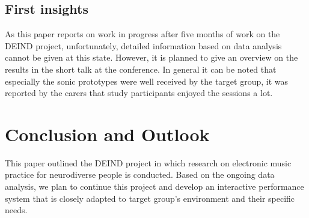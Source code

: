 \documentclass{chi-ext}
\begin{document}
\begin{multicols}{2}
% 
% 
% 
% 
% 
% 
% 
% 
% 
% 
\subsection{First insights}

As this paper reports on work in progress after five months of work on the DEIND project, unfortunately, detailed information based on data analysis cannot be given at this state. 
However, it is planned to give an overview on the results in the short talk at the conference.
In general it can be noted that especially the sonic prototypes were well received by the target group, it was reported by the carers that study participants enjoyed the sessions a lot.

% 
% 
% 
% 


\section{Conclusion and Outlook}
\label{sec:outlook}

This paper outlined the DEIND project in which research on electronic music practice for neurodiverse people is conducted.
Based on the ongoing data analysis, we plan to continue this project and develop an interactive performance system that is closely adapted to target group's environment and their specific needs.






 

\end{multicols}
\end{document}
